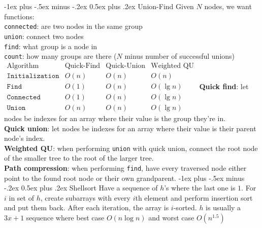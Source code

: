 \documentclass[10pt,landscape]{article}
\makeatletter
\renewcommand{\section}{\@startsection{section}{1}{0mm}%
                                {-1ex plus -.5ex minus -.2ex}%
                                {0.5ex plus .2ex}%
                                {\normalfont\large\bfseries}}
\makeatother
\begin{document}
\begin{multicols}{3}
\section{Union-Find}
Given $N$ nodes, we want functions:\\
\quad \texttt{connected}: are two nodes in the same group\\
\quad \texttt{union}: connect two nodes\\
\quad \texttt{find}: what group is a node in\\
\quad \texttt{count}: how many groups are there ($N$ minus number of successful unions)\\
$\begin{array}{l|c|c|c}
\text{Algorithm} & \text{Quick-Find} & \text{Quick-Union} & \text{Weighted QU}\\
\hline
\texttt{Initialization} & O(n) & O(n) & O(n)\\
\texttt{Find} & O(1) & O(n) & O(\lg n)\\
\texttt{Connected} & O(1) & O(n) & O(\lg n)\\
\texttt{Union} & O(n) & O(n) & O(\lg n)
\end{array}$
\textbf{Quick find}: let nodes be indexes for an array where their value is the group they're in.\\
\textbf{Quick union}: let nodes be indexes for an array where their value is their parent node's index.\\
\textbf{Weighted QU}: when performing \texttt{union} with quick union, connect the root node of the smaller tree to the root of the larger tree.\\
\textbf{Path compression}: when performing \texttt{find}, have every traversed node either point to the found root node or their own grandparent.
\section{Shellsort}
Have a sequence of $h$'s where the last one is $1$. For $i$ in set of $h$, create subarrays with every $i$th element and perform insertion sort and put them back. After each iteration, the array is $i$-sorted. $h$ is usually a $3x+1$ sequence where best case $O(n\log n)$ and worst case $O(n^{1.5})$

\end{multicols}
\end{document}

